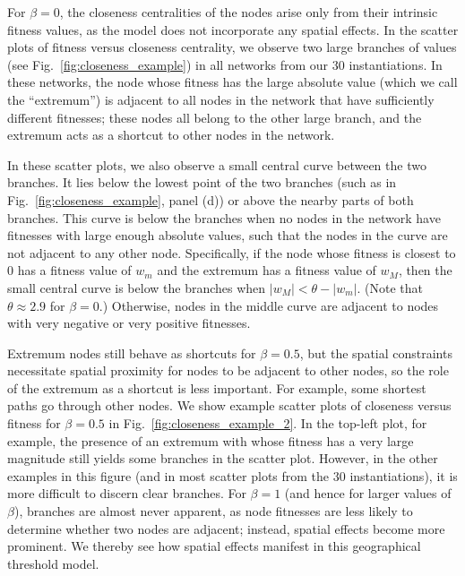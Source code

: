 \documentclass[%
 reprint,
 amsmath,amssymb,
 aps,
]{revtex4-1}
\begin{document}
For $\beta = 0$, the closeness centralities of the nodes arise only from their intrinsic fitness values, as the model does not incorporate any spatial effects. In the scatter plots of fitness versus closeness centrality, we observe two large branches of values (see Fig.~\ref{fig:closeness_example}) in all networks from our $30$ instantiations. In these networks, the node whose fitness has the large absolute value (which we call the ``extremum'') is adjacent to all nodes in the network that have sufficiently different fitnesses; these nodes all belong to the other large branch, and the extremum acts as a shortcut to other nodes in the network.


In these scatter plots, we also observe a small central curve between the two branches. It lies below the lowest point of the two branches (such as in Fig.~\ref{fig:closeness_example}, panel (d)) or above the nearby parts of both branches. This curve is below the branches when no nodes in the network have fitnesses with large enough absolute values, such that the nodes in the curve are not adjacent to any other node. Specifically, if the node whose fitness is closest to $0$ has a fitness value of $w_m$ and the extremum has a fitness value of $w_M$, then the small central curve is below the branches when $|w_M| < \theta - |w_m|$. (Note that $\theta \approx 2.9$ for $\beta = 0$.) Otherwise, nodes in the middle curve are adjacent to nodes with very negative or very positive fitnesses. 

Extremum nodes still behave as shortcuts for $\beta = 0.5$, but the spatial constraints necessitate spatial proximity for nodes to be adjacent to other nodes, so the role of the extremum as a shortcut is less important. For example, some shortest paths go through other nodes. We show example scatter plots of closeness versus fitness for $\beta = 0.5$ in Fig.~\ref{fig:closeness_example_2}. In the top-left plot, for example, the presence of an extremum with whose fitness has a very large magnitude still yields some branches in the scatter plot. However, in the other examples in this figure (and in most scatter plots from the $30$ instantiations), it is more difficult to discern clear branches. For $\beta = 1$ (and hence for larger values of $\beta$), branches are almost never apparent, as node fitnesses are less likely to determine whether two nodes are adjacent; instead, spatial effects become more prominent. We thereby see how spatial effects manifest in this geographical threshold model.
 

\end{document}

